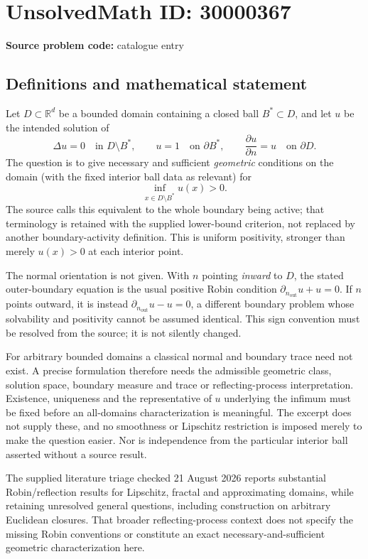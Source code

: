 \documentclass[11pt]{article}
\newcommand{\R}{\mathbb{R}}
\begin{document}
\section*{UnsolvedMath ID: 30000367}
\textbf{Source problem code:} catalogue entry
\subsection{Definitions and mathematical statement}
Let $D\subset\R^d$ be a bounded domain containing a closed ball $B^*\subset D$, and let $u$ be the intended solution of
\[
 \Delta u=0\quad\text{in }D\setminus B^*,\qquad
 u=1\quad\text{on }\partial B^*,\qquad
 \frac{\partial u}{\partial n}=u\quad\text{on }\partial D.
\]
The question is to give necessary and sufficient \emph{geometric} conditions on the domain (with the fixed interior ball data as relevant) for
\[
 \inf_{x\in D\setminus B^*}u(x)>0.
\]
The source calls this equivalent to the whole boundary being active; that terminology is retained with the supplied lower-bound criterion, not replaced by another boundary-activity definition. This is uniform positivity, stronger than merely $u(x)>0$ at each interior point.

The normal orientation is not given. With $n$ pointing \emph{inward} to $D$, the stated outer-boundary equation is the usual positive Robin condition $\partial_{n_{\mathrm{out}}}u+u=0$. If $n$ points outward, it is instead $\partial_{n_{\mathrm{out}}}u-u=0$, a different boundary problem whose solvability and positivity cannot be assumed identical. This sign convention must be resolved from the source; it is not silently changed.

For arbitrary bounded domains a classical normal and boundary trace need not exist. A precise formulation therefore needs the admissible geometric class, solution space, boundary measure and trace or reflecting-process interpretation. Existence, uniqueness and the representative of $u$ underlying the infimum must be fixed before an all-domains characterization is meaningful. The excerpt does not supply these, and no smoothness or Lipschitz restriction is imposed merely to make the question easier. Nor is independence from the particular interior ball asserted without a source result.

The supplied literature triage checked 21 August 2026 reports substantial Robin/reflection results for Lipschitz, fractal and approximating domains, while retaining unresolved general questions, including construction on arbitrary Euclidean closures. That broader reflecting-process context does not specify the missing Robin conventions or constitute an exact necessary-and-sufficient geometric characterization here.
\end{document}
